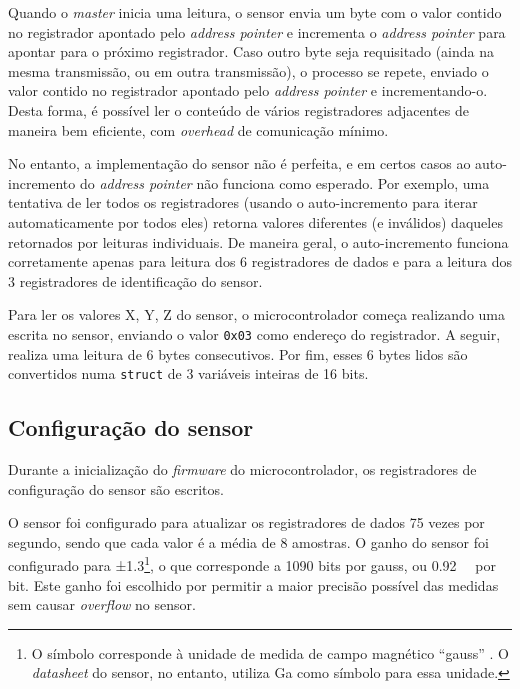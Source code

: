 \documentclass[brazil,pagestart=firstchapter]{abnt}
\begin{document}
Quando o \textit{master} inicia uma leitura, o sensor envia um byte com o
valor contido no registrador apontado pelo \textit{address pointer} e
incrementa o \textit{address pointer} para apontar para o próximo
registrador. Caso outro byte seja requisitado (ainda na mesma transmissão,
ou em outra transmissão), o processo se repete, enviado o valor contido no
registrador apontado pelo \textit{address pointer} e incrementando-o. Desta
forma, é possível ler o conteúdo de vários registradores adjacentes de
maneira bem eficiente, com \textit{overhead} de comunicação mínimo.

No entanto, a implementação do sensor não é perfeita, e em certos casos ao
auto-incremento do \textit{address pointer} não funciona como esperado. Por
exemplo, uma tentativa de ler todos os registradores (usando o
auto-incremento para iterar automaticamente por todos eles) retorna valores
diferentes (e inválidos) daqueles retornados por leituras individuais. De
maneira geral, o auto-incremento funciona corretamente apenas para leitura
dos 6 registradores de dados e para a leitura dos 3 registradores de
identificação do sensor.

Para ler os valores X, Y, Z do sensor, o microcontrolador começa realizando
uma escrita no sensor, enviando o valor \texttt{0x03} como endereço do
registrador. A seguir, realiza uma leitura de 6 bytes consecutivos. Por fim,
esses 6 bytes lidos são convertidos numa \texttt{struct} de 3 variáveis
inteiras de 16 bits.

\subsection{Configuração do sensor}
\label{sub:software_sensor_config}

Durante a inicialização do \textit{firmware} do microcontrolador, os
registradores de configuração do sensor são escritos.

O sensor foi configurado para atualizar os registradores de dados 75 vezes
por segundo, sendo que cada valor é a média de 8 amostras. O ganho do sensor
foi configurado para ±\SI{1.3}{\gauss}\footnote{
	O símbolo \si{\gauss} corresponde à unidade de medida de campo magnético
	``gauss'' \cite[p.~128]{SI}. O \textit{datasheet} do sensor, no entanto,
	utiliza Ga como símbolo para essa unidade.
}, o que corresponde a 1090 bits por gauss, ou \SI{0.92}{\milli\gauss} por
bit. Este ganho foi escolhido por permitir a maior precisão possível das
medidas sem causar \textit{overflow} no sensor.
\end{document}
